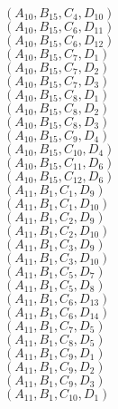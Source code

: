 \documentclass[14pt]{article}
\begin{document}
    $({A}_{10}, {B}_{15}, {C}_{4}, {D}_{10}) $ \\ 
    $({A}_{10}, {B}_{15}, {C}_{6}, {D}_{11}) $ \\ 
    $({A}_{10}, {B}_{15}, {C}_{6}, {D}_{12}) $ \\ 
    $({A}_{10}, {B}_{15}, {C}_{7}, {D}_{1}) $ \\ 
    $({A}_{10}, {B}_{15}, {C}_{7}, {D}_{2}) $ \\ 
    $({A}_{10}, {B}_{15}, {C}_{7}, {D}_{3}) $ \\ 
    $({A}_{10}, {B}_{15}, {C}_{8}, {D}_{1}) $ \\ 
    $({A}_{10}, {B}_{15}, {C}_{8}, {D}_{2}) $ \\ 
    $({A}_{10}, {B}_{15}, {C}_{8}, {D}_{3}) $ \\ 
    $({A}_{10}, {B}_{15}, {C}_{9}, {D}_{4}) $ \\ 
    $({A}_{10}, {B}_{15}, {C}_{10}, {D}_{4}) $ \\ 
    $({A}_{10}, {B}_{15}, {C}_{11}, {D}_{6}) $ \\ 
    $({A}_{10}, {B}_{15}, {C}_{12}, {D}_{6}) $ \\ 
    $({A}_{11}, {B}_{1}, {C}_{1}, {D}_{9}) $ \\ 
    $({A}_{11}, {B}_{1}, {C}_{1}, {D}_{10}) $ \\ 
    $({A}_{11}, {B}_{1}, {C}_{2}, {D}_{9}) $ \\ 
    $({A}_{11}, {B}_{1}, {C}_{2}, {D}_{10}) $ \\ 
    $({A}_{11}, {B}_{1}, {C}_{3}, {D}_{9}) $ \\ 
    $({A}_{11}, {B}_{1}, {C}_{3}, {D}_{10}) $ \\ 
    $({A}_{11}, {B}_{1}, {C}_{5}, {D}_{7}) $ \\ 
    $({A}_{11}, {B}_{1}, {C}_{5}, {D}_{8}) $ \\ 
    $({A}_{11}, {B}_{1}, {C}_{6}, {D}_{13}) $ \\ 
    $({A}_{11}, {B}_{1}, {C}_{6}, {D}_{14}) $ \\ 
    $({A}_{11}, {B}_{1}, {C}_{7}, {D}_{5}) $ \\ 
    $({A}_{11}, {B}_{1}, {C}_{8}, {D}_{5}) $ \\ 
    $({A}_{11}, {B}_{1}, {C}_{9}, {D}_{1}) $ \\ 
    $({A}_{11}, {B}_{1}, {C}_{9}, {D}_{2}) $ \\ 
    $({A}_{11}, {B}_{1}, {C}_{9}, {D}_{3}) $ \\ 
    $({A}_{11}, {B}_{1}, {C}_{10}, {D}_{1}) $ \\ 
\end{document}
